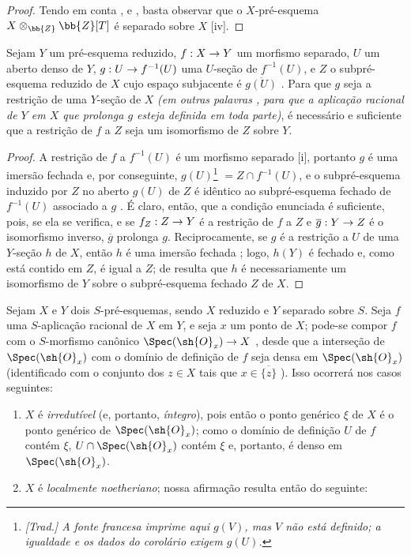 \documentclass[oneside]{amsart}
\makeatletter
\newcommand{\ega@arrow}[2]{\mathchoice{#1}{#2}{#2}{#2}}
\renewcommand{\to}{\ega@arrow{\longrightarrow}{\rightarrow}}
\let\EGAOriginalLabel\label
\renewcommand{\label}[1]{\phantomsection\EGAOriginalLabel{#1}}
\makeatother
\begin{document}
\begin{proof}
Tendo em conta ,  e , basta observar que o $X$-pré-esquema $X\otimes_{\bb{Z}}\bb{Z}[T]$ é separado sobre $X$ [iv].
\end{proof}

\begin{corollary}[7.2.7]
\label{I.7.2.7}
Sejam $Y$ um pré-esquema reduzido, $f:X\to Y$ um morfismo separado, $U$ um aberto denso de $Y$, $g:U\to f^{-1}(U)$ uma $U$-seção de $f^{-1}(U)$, e $Z$ o subpré-esquema reduzido de $X$ cujo espaço subjacente é $\overline{g(U)}$ .
Para que $g$ seja a restrição de uma $Y$-seção de $X$ \emph{(em outras palavras , para que a aplicação racional de $Y$ em $X$ que prolonga $g$ esteja definida em toda parte)}, é necessário e suficiente que a restrição de $f$ a $Z$ seja um isomorfismo de $Z$ sobre $Y$.
\end{corollary}

\begin{proof}
A restrição de $f$ a $f^{-1}(U)$ é um morfismo separado [i], portanto $g$ é uma imersão fechada  e, por conseguinte, $g(U)$\footnote{\emph{[Trad.] A fonte francesa imprime aqui $g(V)$, mas $V$ não está definido; a igualdade e os dados do corolário exigem $g(U)$.}} $=Z\cap f^{-1}(U)$, e o subpré-esquema induzido por $Z$ no aberto $g(U)$ de $Z$ é idêntico ao subpré-esquema fechado de $f^{-1}(U)$ associado a $g$ .
É claro, então, que a condição enunciada é suficiente, pois, se ela se verifica, e se $f_Z:Z\to Y$ é a restrição de $f$ a $Z$ e $\overline{g}:Y\to Z$ é o isomorfismo inverso, $\overline{g}$ prolonga $g$.
Reciprocamente, se $g$ é a restrição a $U$ de uma $Y$-seção $h$ de $X$, então $h$ é uma imersão fechada ; logo, $h(Y)$ é fechado e, como está contido em $Z$, é igual a $Z$; de  resulta que $h$ é necessariamente um isomorfismo de $Y$ sobre o subpré-esquema fechado $Z$ de $X$.
\end{proof}

\begin{env}[7.2.8]
\label{I.7.2.8}
Sejam $X$ e $Y$ dois $S$-pré-esquemas, sendo $X$ reduzido e $Y$ separado sobre $S$.
Seja $f$ uma $S$-aplicação racional de $X$ em $Y$, e seja $x$ um ponto de $X$; pode-se compor $f$ com o $S$-morfismo canônico $\Spec(\sh{O}_x)\to X$ , desde que a interseção de $\Spec(\sh{O}_x)$ com o domínio de definição de $f$ seja densa em $\Spec(\sh{O}_x)$ (identificado com o conjunto dos $z\in X$ tais que $x\in\overline{\{z\}}$ ).
Isso ocorrerá nos casos seguintes:
\begin{enumerate}
  \item[1.º] $X$ é \emph{irredutível} (e, portanto, \emph{íntegro}), pois então o ponto genérico $\xi$ de $X$ é o ponto genérico de $\Spec(\sh{O}_x)$; como o domínio de definição $U$ de $f$ contém $\xi$, $U\cap\Spec(\sh{O}_x)$ contém $\xi$ e, portanto, é denso em $\Spec(\sh{O}_x)$.
  \item[2.º] $X$ é \emph{localmente noetheriano}; nossa afirmação resulta então do seguinte:
\end{enumerate}
\end{env}
\end{document}
